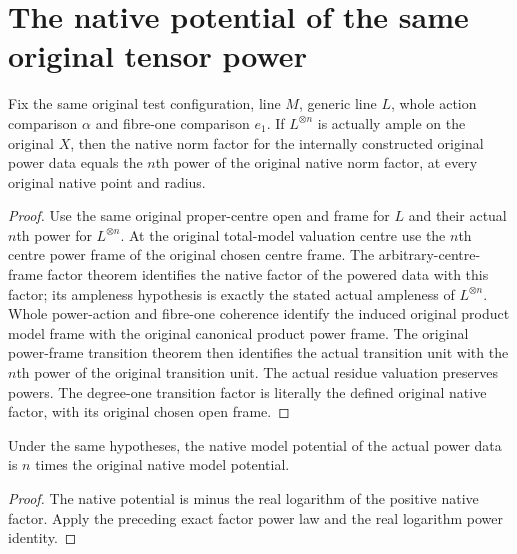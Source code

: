 \section{The native potential of the same original tensor power}

\begin{theorem}
\label{thm:native-tc-nef-fs-power-factor}
\leanok
{}
Fix the same original test configuration, line $M$, generic line $L$,
whole action comparison $\alpha$ and fibre-one comparison $e_1$.
If $L^{\otimes n}$ is actually ample on the original $X$, then the native
norm factor for the internally constructed original power data equals
the $n$th power of the original native norm factor, at every original
native point and radius.
\end{theorem}
\begin{proof}
Use the same original proper-centre open and frame for $L$ and their
actual $n$th power for $L^{\otimes n}$.  At the original total-model
valuation centre use the $n$th centre power frame of the original
chosen centre frame.  The arbitrary-centre-frame factor theorem
identifies the native factor of the powered data with this factor;
its ampleness hypothesis is exactly the stated actual ampleness of
$L^{\otimes n}$.  Whole power-action and fibre-one coherence identify
the induced original product model frame with the original canonical
product power frame.  The original power-frame transition theorem then
identifies the actual transition unit with the $n$th power of the
original transition unit.  The actual residue valuation preserves
powers.  The degree-one transition factor is literally the defined
original native factor, with its original chosen open frame.
\end{proof}

\begin{theorem}
\label{thm:native-tc-nef-fs-power-potential}
\leanok
{}
Under the same hypotheses, the native model potential of the actual
power data is $n$ times the original native model potential.
\end{theorem}
\begin{proof}
The native potential is minus the real logarithm of the positive native
factor.  Apply the preceding exact factor power law and the real
logarithm power identity.
\end{proof}
